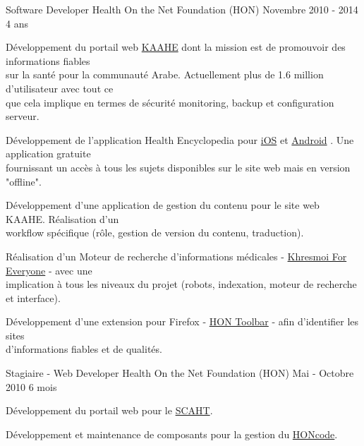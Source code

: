 \begin{cventries}
  \cventry
    {Software Developer}
    {Health On the Net Foundation (HON)}
    {Novembre 2010 - 2014}
    {4 ans}
    {
      \begin{cvitems}
        \item{Développement du portail web
          {\color{awesome-skyblue}\href{http://www.kaahe.org/}{KAAHE}}
          dont la mission est de promouvoir des informations fiables \\
          sur la santé pour la communauté Arabe. Actuellement plus de 1.6
          million d'utilisateur avec tout ce \\que cela implique en termes de
          sécurité monitoring, backup et configuration serveur.
        }
        \item{Développement de l'application Health Encyclopedia pour
          {\color{awesome-skyblue}
            \href{https://itunes.apple.com/us/app/almwsw-t-alshyt/id624559765?l=fr&ls=1&mt=8}{iOS}}
          et
          {\color{awesome-skyblue}
            \href{https://play.google.com/store/apps/details?id=org.kaahe.kaaheApp&hl=en}{Android}}
          . Une application gratuite \\fournissant un accès à tous les sujets
          disponibles sur le site web mais en version "offline".
        }
        \item{Développement d'une application de gestion du contenu pour le
          site web KAAHE. Réalisation d'un \\workflow spécifique (rôle, gestion
          de version du contenu, traduction).
        }
        \item{Réalisation d'un Moteur de recherche d'informations médicales -
          {\color{awesome-skyblue}
            \href{http://everyone.khresmoi.eu/}{Khresmoi For Everyone}}
            - avec une \\implication à tous les niveaux du projet (robots,
            indexation, moteur de recherche et interface).
        }
        \item{Développement d'une extension pour Firefox -
          {\color{awesome-skyblue}
          \href{https://addons.mozilla.org/en-US/firefox/addon/hon-toolbar/}{HON Toolbar}} -
          afin d'identifier les sites \\d'informations fiables et de qualités.
        }
      \end{cvitems}
    }

  \cventry
    {Stagiaire - Web Developer}
    {Health On the Net Foundation (HON)}
    {Mai - Octobre 2010}
    {6 mois}
    {
      \begin{cvitems}
        \item{Développement du portail web pour le
          {\color{awesome-skyblue}\href{http://scaht.org/}{SCAHT}}.
        }
        \item{Développement et maintenance de composants pour la gestion du
          {\color{awesome-skyblue}
            \href{http://www.hon.ch/HONcode/Pro/Visitor/visitor.html}{HONcode}}.
        }
      \end{cvitems}
    }


\end{cventries}
